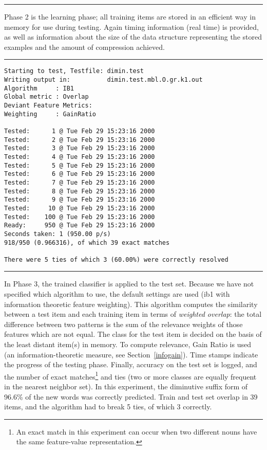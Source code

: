 \documentclass{report}
\begin{document}
\rule{\textwidth}{0.5mm}

\vspace{1cm}

Phase 2 is the learning phase; all training items are stored in an
efficient way in memory for use during testing. Again timing
information (real time) is provided, as well as information about the
size of the data structure representing the stored examples and the
amount of compression achieved. 

\vspace{1cm}

\rule{\textwidth}{0.5mm}

{\small
\begin{verbatim}
Starting to test, Testfile: dimin.test
Writing output in:          dimin.test.mbl.O.gr.k1.out
Algorithm     : IB1
Global metric : Overlap 
Deviant Feature Metrics:
Weighting     : GainRatio
 
Tested:      1 @ Tue Feb 29 15:23:16 2000
Tested:      2 @ Tue Feb 29 15:23:16 2000
Tested:      3 @ Tue Feb 29 15:23:16 2000
Tested:      4 @ Tue Feb 29 15:23:16 2000
Tested:      5 @ Tue Feb 29 15:23:16 2000
Tested:      6 @ Tue Feb 29 15:23:16 2000
Tested:      7 @ Tue Feb 29 15:23:16 2000
Tested:      8 @ Tue Feb 29 15:23:16 2000
Tested:      9 @ Tue Feb 29 15:23:16 2000
Tested:     10 @ Tue Feb 29 15:23:16 2000
Tested:    100 @ Tue Feb 29 15:23:16 2000
Ready:     950 @ Tue Feb 29 15:23:16 2000
Seconds taken: 1 (950.00 p/s)
918/950 (0.966316), of which 39 exact matches
 
There were 5 ties of which 3 (60.00%) were correctly resolved          
\end{verbatim}
}

\rule{\textwidth}{0.5mm}

\vspace{1cm}

In Phase 3, the trained classifier is applied to the test set. Because
we have not specified which algorithm to use, the default settings are
used ({\sc ib1} with information theoretic feature weighting). This
algorithm computes the similarity between a test item and each
training item in terms of {\em weighted overlap}: the total difference
between two patterns is the sum of the relevance weights of those
features which are not equal. The class for the test item is decided
on the basis of the least distant item(s) in memory. To compute
relevance, Gain Ratio is used (an information-theoretic measure, see
Section~\ref{infogain}). Time stamps indicate the progress of the
testing phase. Finally, accuracy on the test set is logged, and the
number of exact matches\footnote{An exact match in this experiment can
occur when two different nouns have the same feature-value
representation.} and ties (two or more classes are equally frequent in
the nearest neighbor set). In this experiment, the diminutive suffix
form of 96.6\% of the new words was correctly predicted. Train and
test set overlap in 39 items, and the algorithm had to break 5 ties,
of which 3 correctly.
\end{document}
